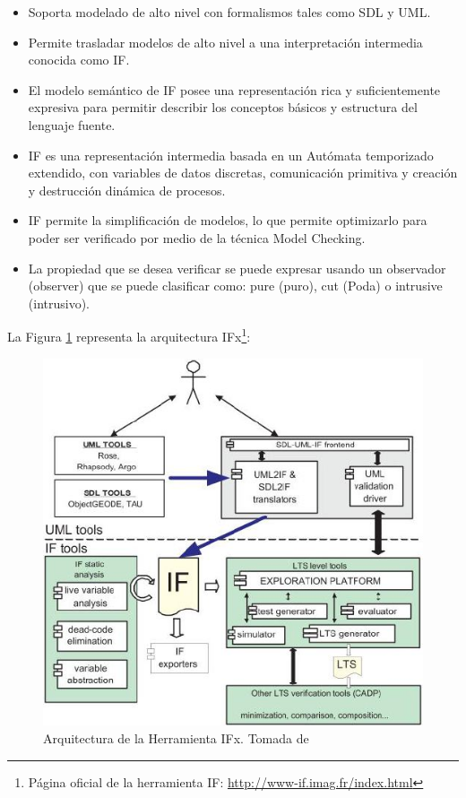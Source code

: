 \begin{itemize}
 \item Soporta modelado de alto nivel con formalismos tales como SDL y 
UML.
\item Permite trasladar modelos de alto nivel a una interpretaci\'on 
intermedia conocida como IF.
\item El modelo sem\'antico de IF posee una representaci\'on rica y 
suficientemente expresiva para permitir describir los conceptos b\'asicos y 
estructura del lenguaje fuente.
 \item IF es una representaci\'on intermedia basada en un Aut\'omata 
temporizado extendido, con variables de datos discretas, comunicaci\'on 
primitiva y creaci\'on y destrucci\'on din\'amica de procesos.
\item IF permite la simplificaci\'on de modelos, lo que permite optimizarlo 
para poder ser verificado por medio de la t\'ecnica Model Checking.
\item La propiedad que se desea verificar se puede expresar usando un 
observador (observer) que se puede clasificar como: pure (puro), cut (Poda) o 
intrusive (intrusivo).
\end{itemize}

La Figura \ref{fig:arquiIF} representa la arquitectura IFx\footnote{P\'agina 
oficial de la herramienta IF: \url{http://www-if.imag.fr/index.html}}:

\begin{figure}[H]
  \centering
  \includegraphics[scale=0.6]{./images/ArquitecturaIF.jpg}
  \caption{Arquitectura de la Herramienta IFx. Tomada de~\cite{Bozga2004}}
  \label{fig:arquiIF}
\end{figure}

